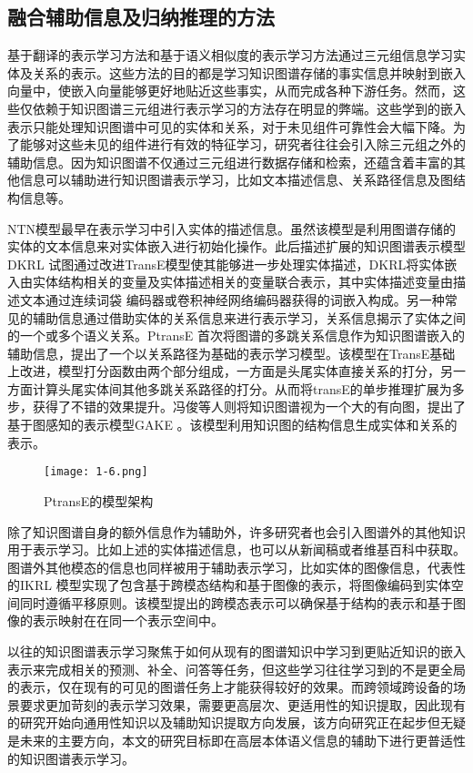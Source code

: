 \subsection{融合辅助信息及归纳推理的方法}
基于翻译的表示学习方法和基于语义相似度的表示学习方法通过三元组信息学习实体及关系的表示。这些方法的目的都是学习知识图谱存储的事实信息并映射到嵌入向量中，使嵌入向量能够更好地贴近这些事实，从而完成各种下游任务。然而，这些仅依赖于知识图谱三元组进行表示学习的方法存在明显的弊端。这些学到的嵌入表示只能处理知识图谱中可见的实体和关系，对于未见组件可靠性会大幅下降。为了能够对这些未见的组件进行有效的特征学习，研究者往往会引入除三元组之外的辅助信息。因为知识图谱不仅通过三元组进行数据存储和检索，还蕴含着丰富的其他信息可以辅助进行知识图谱表示学习，比如文本描述信息、关系路径信息及图结构信息等。

NTN模型最早在表示学习中引入实体的描述信息。虽然该模型是利用图谱存储的实体的文本信息来对实体嵌入进行初始化操作。此后描述扩展的知识图谱表示模型DKRL \cite{xie2016representation}试图通过改进TransE模型使其能够进一步处理实体描述，DKRL将实体嵌入由实体结构相关的变量及实体描述相关的变量联合表示，其中实体描述变量由描述文本通过连续词袋 \cite{valverde2012link}编码器或卷积神经网络编码器获得的词嵌入构成。另一种常见的辅助信息通过借助实体的关系信息来进行表示学习，关系信息揭示了实体之间的一个或多个语义关系。PtransE \cite{lin2015modeling}首次将图谱的多跳关系信息作为知识图谱嵌入的辅助信息，提出了一个以关系路径为基础的表示学习模型。该模型在TransE基础上改进，模型打分函数由两个部分组成，一方面是头尾实体直接关系的打分，另一方面计算头尾实体间其他多跳关系路径的打分。从而将transE的单步推理扩展为多步，获得了不错的效果提升。冯俊等人则将知识图谱视为一个大的有向图，提出了基于图感知的表示模型GAKE \cite{feng2016gake}。该模型利用知识图的结构信息生成实体和关系的表示。
\begin{figure}[h]
  \centering
  \texttt{[image: 1-6.png]}
  \caption{PtransE的模型架构}
  \label{fig:1-6}
\end{figure}

除了知识图谱自身的额外信息作为辅助外，许多研究者也会引入图谱外的其他知识用于表示学习。比如上述的实体描述信息，也可以从新闻稿或者维基百科中获取。图谱外其他模态的信息也同样被用于辅助表示学习，比如实体的图像信息，代表性的IKRL \cite{xie2016image}模型实现了包含基于跨模态结构和基于图像的表示，将图像编码到实体空间同时遵循平移原则。该模型提出的跨模态表示可以确保基于结构的表示和基于图像的表示映射在在同一个表示空间中。

以往的知识图谱表示学习聚焦于如何从现有的图谱知识中学习到更贴近知识的嵌入表示来完成相关的预测、补全、问答等任务，但这些学习往往学习到的不是更全局的表示，仅在现有的可见的图谱任务上才能获得较好的效果。而跨领域跨设备的场景要求更加苛刻的表示学习效果，需要更高层次、更适用性的知识提取，因此现有的研究开始向通用性知识以及辅助知识提取方向发展，该方向研究正在起步但无疑是未来的主要方向，本文的研究目标即在高层本体语义信息的辅助下进行更普适性的知识图谱表示学习。

